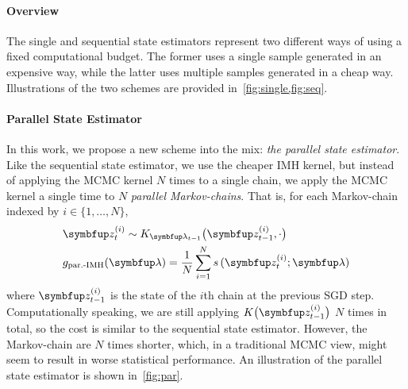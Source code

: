 \vspace{-0.08in}
\paragraph{Overview}
The single and sequential state estimators represent two different ways of using a fixed computational budget.
The former uses a single sample generated in an expensive way, while the latter uses multiple samples generated in a cheap way.
Illustrations of the two schemes are provided in~\cref{fig:single,fig:seq}.

\vspace{-0.08in}
\paragraph{Parallel State Estimator}
In this work, we propose a new scheme into the mix: \textit{the parallel state estimator}.
Like the sequential state estimator, we use the cheaper IMH kernel, but instead of applying the MCMC kernel \(N\) times to a single chain, we apply the MCMC kernel a single time to \(N\) \textit{parallel Markov-chains}.
That is, for each Markov-chain indexed by \(i \in \{1, \ldots, N\}\),
%
\vspace{-0.05in}
\begin{align*}
  &\vz_{t}^{(i)} \sim K_{\vlambda_{t-1}}\big(\vz_{t-1}^{(i)}, \cdot \big) \\
  &g_{\text{par.-IMH}}(\vlambda) = \frac{1}{N} \sum_{i=1}^N s\,(\vz_{t}^{(i)}; \vlambda)
\end{align*}
%
where \(\vz_{t-1}^{(i)}\) is the state of the \(i\)th chain at the previous SGD step.
Computationally speaking, we are still applying \(K\big(\vz_{t-1}^{(i)}\big)\) \(N\) times in total, so the cost is similar to the sequential state estimator.
However, the Markov-chain are \(N\) times shorter, which, in a traditional MCMC view, might seem to result in worse statistical performance.
An illustration of the parallel state estimator is shown in~\cref{fig:par}.

\vspace{-0.05in}
